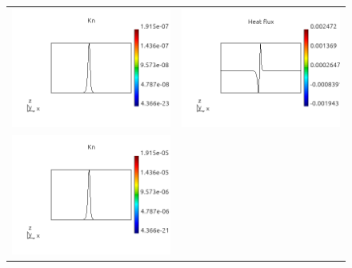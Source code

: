 \documentclass[review]{elsarticle}
\begin{document}
\begin{figure}[tbh]
  \begin{center}
    \begin{tabular}{cc}
      \includegraphics[width=\psize\textwidth]{figs/Kn_p61D1e14.png} &
      \includegraphics[width=\psize\textwidth]{figs/hflux_p61D1e14.png} \\
      \includegraphics[width=\psize\textwidth]{figs/Kn_p61D1e12.png} &

\end{tabular}
\end{center}
\end{figure}
\end{document}
